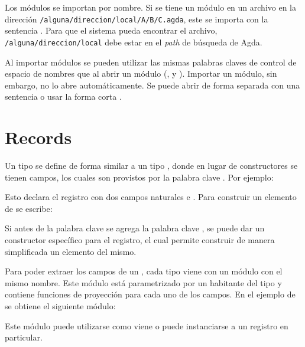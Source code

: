 Los módulos se importan por nombre. Si se tiene un módulo  en un archivo en la dirección \texttt{/alguna/direccion/local/A/B/C.agda}, este se importa con la sentencia  . Para que el sistema pueda encontrar el archivo, \texttt{/alguna/direccion/local} debe estar en el \textit{path} de búsqueda de Agda. 

Al importar módulos se pueden utilizar las mismas palabras claves de control de espacio de nombres que al abrir un módulo (,  y ). Importar un módulo, sin embargo, no lo abre automáticamente. Se puede abrir de forma separada con una sentencia  o usar la forma corta  .

\section{Records}\label{agda:records}

Un tipo  se define de forma similar a un tipo , donde en lugar de constructores se tienen campos, los cuales son provistos por la palabra clave . Por ejemplo: 


Esto declara el registro  con dos campos naturales  e . Para construir un elemento de  se escribe:


Si antes de la palabra clave  se agrega la palabra clave , se puede dar un constructor específico para el registro, el cual permite construir de manera simplificada un elemento del mismo. 


Para poder extraer los campos de un , cada tipo  viene con un módulo con el mismo nombre. Este módulo está parametrizado por un habitante del tipo y contiene funciones de proyección para cada uno de los campos. En el ejemplo de  se obtiene el siguiente módulo:


Este módulo puede utilizarse como viene o puede instanciarse a un registro en particular. 

